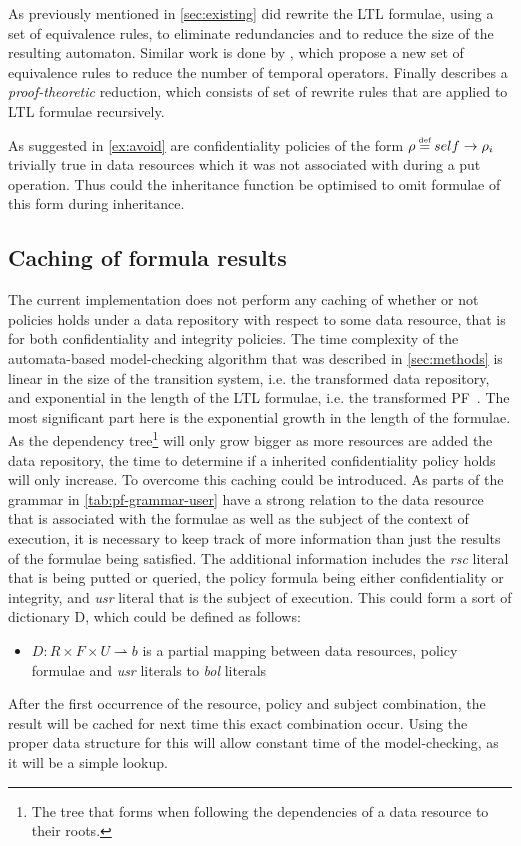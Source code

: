 As previously mentioned in \autoref{sec:existing} did \cite{somenzi2000efficient} rewrite the LTL formulae, using a set of equivalence rules, to eliminate redundancies and to reduce the size of the resulting automaton. Similar work is done by \cite{babiak2012ltl}, which propose a new set of equivalence rules to reduce the number of temporal operators. Finally \cite{etessami2000optimizing} describes a \emph{proof-theoretic} reduction, which consists of set of rewrite rules that are applied to LTL formulae recursively.

As suggested in \autoref{ex:avoid} are confidentiality policies of the form $\conf \eqdef self \imply \conf_i$ trivially true in data resources which it was not associated with during a put operation. Thus could the inheritance function be optimised to omit formulae of this form during inheritance.

\subsection{Caching of formula results}\label{sec:cache}
The current implementation does not perform any caching of whether or not policies holds under a data repository with respect to some data resource, that is for both confidentiality and integrity policies. The time complexity of the automata-based model-checking algorithm that was described in \autoref{sec:methods} is linear in the size of the transition system, i.e. the transformed data repository, and exponential in the length of the LTL formulae, i.e. the transformed PF~\cite{baier2008principles}. The most significant part here is the exponential growth in the length of the formulae. As the dependency tree\footnote{The tree that forms when following the dependencies of a data resource to their roots.} will only grow bigger as more resources are added the data repository, the time to determine if a inherited confidentiality policy holds will only increase. To overcome this caching could be introduced. As parts of the grammar in \autoref{tab:pf-grammar-user} have a strong relation to the data resource that is associated with the formulae as well as the subject of the context of execution, it is necessary to keep track of more information than just the results of the formulae being satisfied. The additional information includes the \emph{rsc} literal that is being putted or queried, the policy formula being either confidentiality or integrity, and \emph{usr} literal that is the subject of execution. This could form a sort of dictionary D, which could be defined as follows:
\begin{itemize}
    \item $D : R \times F \times U \rightharpoonup b$ is a partial mapping between data resources, policy formulae and \emph{usr} literals to \emph{bol} literals
\end{itemize}
After the first occurrence of the resource, policy and subject combination, the result will be cached for next time this exact combination occur. Using the proper data structure for this will allow constant time of the model-checking, as it will be a simple lookup.